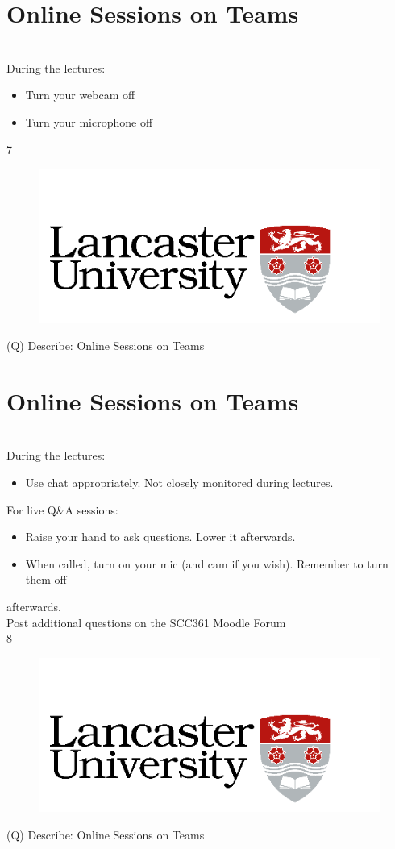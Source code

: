 \documentclass[12pt]{article}
\begin{document}
\section{Online Sessions on Teams}
\\
During the lectures:\\
\begin{itemize}
  \item Turn your webcam off
  \item Turn your microphone off
\end{itemize}
7\\
\begin{figure}[H]
\includegraphics[width=0.5\linewidth]{page1-image-1.png}
\end{figure}
\clearpage
(Q)
Describe: Online Sessions on Teams
\clearpage
\section{Online Sessions on Teams}
\\
During the lectures:\\
\begin{itemize}
  \item Use  chat  appropriately. Not closely monitored during lectures.
\end{itemize}
For live Q\&A sessions:\\
\begin{itemize}
  \item Raise your hand to ask questions. Lower it afterwards.
  \item When called, turn on your mic (and cam if you wish). Remember to turn them off 
\end{itemize}
afterwards.\\
Post additional questions on the SCC361 Moodle Forum\\
8\\
\begin{figure}[H]
\includegraphics[width=0.5\linewidth]{page1-image-1.png}
\end{figure}
\clearpage
(Q)
Describe: Online Sessions on Teams
\clearpage
\end{document}
